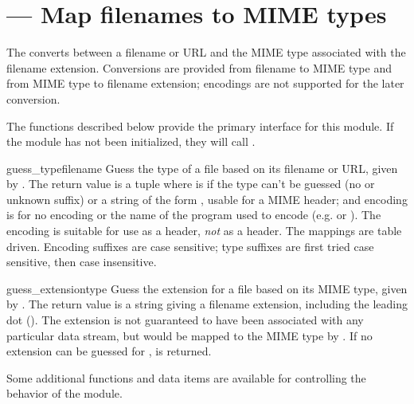 \section{ ---
         Map filenames to MIME types}




The  converts between a filename or URL and the MIME
type associated with the filename extension.  Conversions are provided 
from filename to MIME type and from MIME type to filename extension;
encodings are not supported for the later conversion.

The functions described below provide the primary interface for this
module.  If the module has not been initialized, they will call
.


\begin{funcdesc}{guess_type}{filename}
Guess the type of a file based on its filename or URL, given by
.
The return value is a tuple  where
 is  if the type can't be guessed (no or unknown
suffix) or a string of the form ,
usable for a MIME  header; and 
encoding is  for no encoding or the name of the program used
to encode (e.g.  or ).  The encoding
is suitable for use as a  header,
\emph{not} as a  header.  The mappings
are table driven.  Encoding suffixes are case sensitive; type suffixes
are first tried case sensitive, then case insensitive.
\end{funcdesc}

\begin{funcdesc}{guess_extension}{type}
Guess the extension for a file based on its MIME type, given by
.
The return value is a string giving a filename extension, including the
leading dot ().  The extension is not guaranteed to have been
associated with any particular data stream, but would be mapped to the 
MIME type  by .  If no extension can
be guessed for ,  is returned.
\end{funcdesc}


Some additional functions and data items are available for controlling
the behavior of the module.


